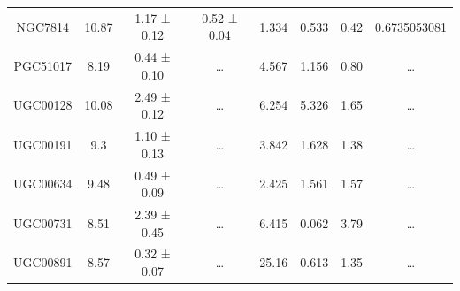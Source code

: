 \documentclass[reprint,%
 amsmath,amssymb,
 aps,
]{revtex4-1}
\begin{document}
\begin{table}[]
\begin{tabular}{cccccrrc}
\rowcolor[HTML]{F3F3F3} 
NGC7814              & 10.87                     & 1.17 ± 0.12           & 0.52 ± 0.04            & 1.334                                                        & 0.533                                                         & 0.42                                                          & \multicolumn{1}{r}{\cellcolor[HTML]{F3F3F3}0.6735053081}      \\
\rowcolor[HTML]{F3F3F3} 
PGC51017             & 8.19                      & 0.44 ± 0.10           & …                      & 4.567                                                        & 1.156                                                         & 0.80                                                          & …                                                             \\
\rowcolor[HTML]{F3F3F3} 
UGC00128             & 10.08                     & 2.49 ± 0.12           & …                      & 6.254                                                        & 5.326                                                           & 1.65                                                           & …                                                             \\
\rowcolor[HTML]{F3F3F3} 
UGC00191             & 9.3                       & 1.10 ± 0.13           & …                      & 3.842                                                        & 1.628                                                           & 1.38                                                          & …                                                             \\
\rowcolor[HTML]{F3F3F3} 
UGC00634             & 9.48                      & 0.49 ± 0.09           & …                      & 2.425                                                        & 1.561                                                          & 1.57                                                            & …                                                             \\
\rowcolor[HTML]{F3F3F3} 
UGC00731             & 8.51                      & 2.39 ± 0.45           & …                      & 6.415                                                        & 0.062                                                         & 3.79                                                           & …                                                             \\
\rowcolor[HTML]{F3F3F3} 
UGC00891             & 8.57                      & 0.32 ± 0.07           & …                      & 25.16                                                        & 0.613                                                          & 1.35                                                           & …                                                             \\

\end{tabular}
\end{table}
\end{document}
